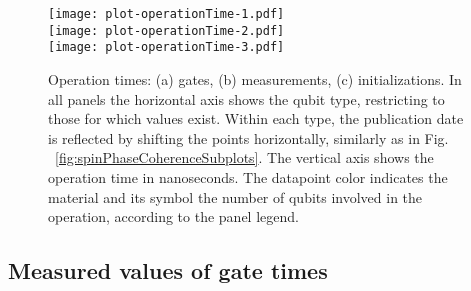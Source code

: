 \documentclass[aps, prx, showpacs, twocolumn, superscriptaddress, notitlepage, longbibliography, floatfix, nofootinbib]{revtex4-2}
\begin{document}
\begin{figure}[t!]
  \texttt{[image: plot-operationTime-1.pdf]} \hfill\\
  \texttt{[image: plot-operationTime-2.pdf]} \hfill\\
  \texttt{[image: plot-operationTime-3.pdf]}\\
  \caption{
  \label{fig:operationTime}
    Operation times: (a) gates, (b) measurements, (c) initializations. In all panels the horizontal axis shows the qubit type, restricting to those for which values exist. Within each type, the publication date is reflected by shifting the points horizontally, similarly as in Fig. ~\ref{fig:spinPhaseCoherenceSubplots}. The vertical axis shows the operation time in nanoseconds. The datapoint color indicates the material and its symbol the number of qubits involved in the operation, according to the panel legend. 
  }
\end{figure}

\subsection{Measured values of gate times}
\end{document}
